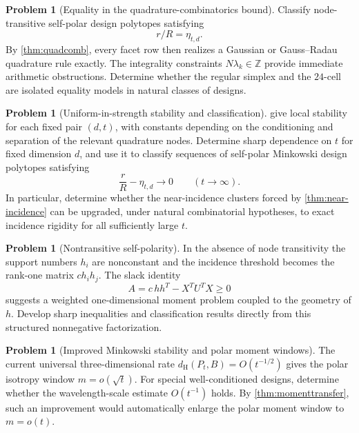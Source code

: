 \documentclass[11pt]{amsart}
\theoremstyle{definition}
\newtheorem{problem}[theorem]{Problem}
\theoremstyle{remark}
\newcommand{\dH}{d_{\mathrm H}}
\begin{document}
\begin{problem}[Equality in the quadrature-combinatorics bound]
Classify node-transitive self-polar design polytopes satisfying
\[
 r/R=\eta_{t,d}.
\]
By \cref{thm:quadcomb}, every facet row then realizes a Gaussian or Gauss--Radau quadrature rule exactly.  The integrality constraints $N\lambda_k\in\mathbb Z$ provide immediate arithmetic obstructions.  Determine whether the regular simplex and the $24$-cell are isolated equality models in natural classes of designs.
\end{problem}

\begin{problem}[Uniform-in-strength stability and classification]
 give local stability for each fixed pair $(d,t)$, with constants depending on the conditioning and separation of the relevant quadrature nodes.  Determine sharp dependence on $t$ for fixed dimension $d$, and use it to classify sequences of self-polar Minkowski design polytopes satisfying
\[
 \frac rR-\eta_{t,d}\longrightarrow0
 \qquad (t\to\infty).
\]
In particular, determine whether the near-incidence clusters forced by \cref{thm:near-incidence} can be upgraded, under natural combinatorial hypotheses, to exact incidence rigidity for all sufficiently large $t$.
\end{problem}

\begin{problem}[Nontransitive self-polarity]
In the absence of node transitivity the support numbers $h_i$ are nonconstant and the incidence threshold becomes the rank-one matrix $c h_i h_j$.  The slack identity
\[
 A=c\,hh^T-X^TU^TX\ge0
\]
suggests a weighted one-dimensional moment problem coupled to the geometry of $h$.  Develop sharp inequalities and classification results directly from this structured nonnegative factorization.
\end{problem}

\begin{problem}[Improved Minkowski stability and polar moment windows]
The current universal three-dimensional rate $\dH(P_t,B)=O(t^{-1/2})$ gives the polar isotropy window $m=o(\sqrt t)$.  For special well-conditioned designs, determine whether the wavelength-scale estimate $O(t^{-1})$ holds.  By \cref{thm:momenttransfer}, such an improvement would automatically enlarge the polar moment window to $m=o(t)$.
\end{problem}
\end{document}
